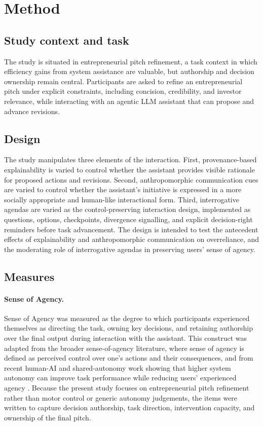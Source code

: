 \documentclass[sigconf,review,anonymous]{acmart}
\begin{document}
\section{Method}

\subsection{Study context and task}

The study is situated in entrepreneurial pitch refinement, a task context in which efficiency gains from system assistance are valuable, but authorship and decision ownership remain central. Participants are asked to refine an entrepreneurial pitch under explicit constraints, including concision, credibility, and investor relevance, while interacting with an agentic LLM assistant that can propose and advance revisions.

\subsection{Design}

The study manipulates three elements of the interaction. First, provenance-based explainability is varied to control whether the assistant provides visible rationale for proposed actions and revisions. Second, anthropomorphic communication cues are varied to control whether the assistant’s initiative is expressed in a more socially appropriate and human-like interactional form. Third, interrogative agendas are varied as the control-preserving interaction design, implemented as questions, options, checkpoints, divergence signalling, and explicit decision-right reminders before task advancement. The design is intended to test the antecedent effects of explainability and anthropomorphic communication on overreliance, and the moderating role of interrogative agendas in preserving users’ sense of agency.

\subsection{Measures}

\paragraph{Sense of Agency.}
Sense of Agency was measured as the degree to which participants experienced themselves as directing the task, owning key decisions, and retaining authorship over the final output during interaction with the assistant. This construct was adapted from the broader sense-of-agency literature, where sense of agency is defined as perceived control over one’s actions and their consequences, and from recent human-AI and shared-autonomy work showing that higher system autonomy can improve task performance while reducing users’ experienced agency \cite{tapal2017measure,legaspi2024sense,collier2025sense}. Because the present study focuses on entrepreneurial pitch refinement rather than motor control or generic autonomy judgements, the items were written to capture decision authorship, task direction, intervention capacity, and ownership of the final pitch.
\end{document}
